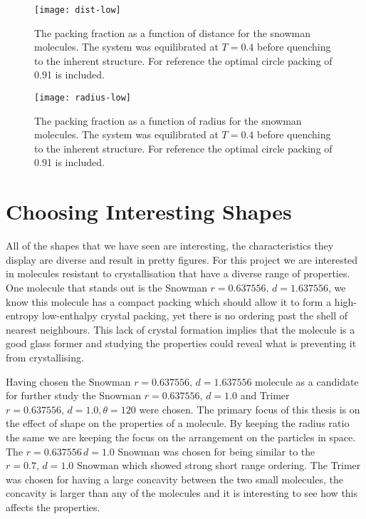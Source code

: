 \begin{figure}
    \centering
    \texttt{[image: dist-low]}
    \caption[Packing fraction of snowmen as a function of distance ($T=0.4$)]{The packing fraction as a function of distance for the snowman molecules. The system was equilibrated at $T=0.4$ before quenching to the inherent structure. For reference the optimal circle packing of 0.91 is included.}
    \label{fig:snowman dist low}
\end{figure}

\begin{figure}
    \centering
    \texttt{[image: radius-low]}
    \caption[Packing fraction of snowmen as a function of radius ($T=0.4$)]{The packing fraction as a function of radius for the snowman molecules. The system was equilibrated at $T=0.4$ before quenching to the inherent structure. For reference the optimal circle packing of 0.91 is included.}
    \label{fig:snowman radius low}
\end{figure}

\section{Choosing Interesting Shapes}

All of the shapes that we have seen are interesting, the characteristics they display are diverse and result in pretty figures. For this project we are interested in molecules resistant to crystallisation that have a diverse range of properties. One molecule that stands out is the Snowman $r=0.637556,\,d=1.637556$, we know this molecule has a compact packing which should allow it to form a high-entropy low-enthalpy crystal packing, yet there is no ordering past the shell of nearest neighbours. This lack of crystal formation implies that the molecule is a good glass former and studying the properties could reveal what is preventing it from crystallising.

Having chosen the Snowman $r=0.637556,\, d=1.637556$ molecule as a candidate for further study the Snowman $r=0.637556,\,d=1.0$ and Trimer $r=0.637556,\,d=1.0,\theta=120$ were chosen. The primary focus of this thesis is on the effect of shape on the properties of a molecule. By keeping the radius ratio the same we are keeping the focus on the arrangement on the particles in space. The $r=0.637556\,d=1.0$ Snowman was chosen for being similar to the $r=0.7,\,d=1.0$ Snowman which showed strong short range ordering. The Trimer was chosen for having a large concavity between the two small molecules, the concavity is larger than any of the molecules and it is interesting to see how this affects the properties.




